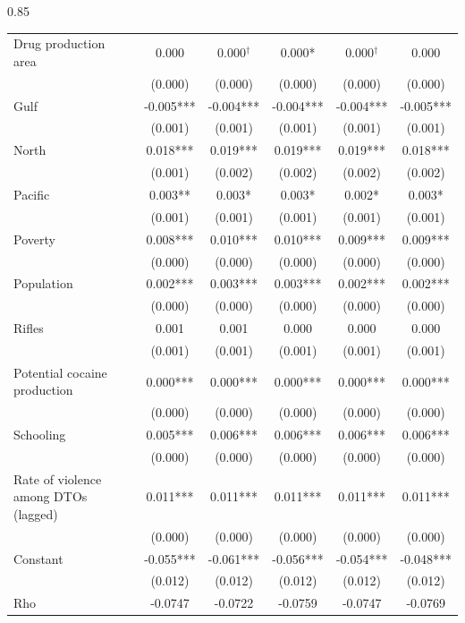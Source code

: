 \documentclass[12pt,letterpaper]{article}
\begin{document}
\begin{landscape}
\begin{center}
\begin{spacing}{0.85}
\begin{longtable}{lccccc}
Drug production area & 0.000 & 0.000$^{\dag}$ & 0.000* & 0.000$^{\dag}$ & 0.000 \\ 
 & (0.000) & (0.000) & (0.000) & (0.000) & (0.000) \\ 
Gulf & -0.005*** & -0.004*** & -0.004*** & -0.004*** & -0.005*** \\ 
 & (0.001) & (0.001) & (0.001) & (0.001) & (0.001) \\ 
North & 0.018*** & 0.019*** & 0.019*** & 0.019*** & 0.018*** \\ 
 & (0.001) & (0.002) & (0.002) & (0.002) & (0.002) \\ 
Pacific & 0.003** & 0.003* & 0.003* & 0.002* & 0.003* \\ 
 & (0.001) & (0.001) & (0.001) & (0.001) & (0.001) \\ 
Poverty & 0.008*** & 0.010*** & 0.010*** & 0.009*** & 0.009*** \\ 
 & (0.000) & (0.000) & (0.000) & (0.000) & (0.000) \\ 
Population & 0.002*** & 0.003*** & 0.003*** & 0.002*** & 0.002*** \\ 
 & (0.000) & (0.000) & (0.000) & (0.000) & (0.000) \\ 
Rifles & 0.001 & 0.001 & 0.000 & 0.000 & 0.000 \\ 
 & (0.001) & (0.001) & (0.001) & (0.001) & (0.001) \\ 
Potential cocaine production & 0.000*** & 0.000*** & 0.000*** & 0.000*** & 0.000*** \\ 
 & (0.000) & (0.000) & (0.000) & (0.000) & (0.000) \\ 
Schooling & 0.005*** & 0.006*** & 0.006*** & 0.006*** & 0.006*** \\ 
 & (0.000) & (0.000) & (0.000) & (0.000) & (0.000) \\ 
Rate of violence among DTOs (lagged) & 0.011*** & 0.011*** & 0.011*** & 0.011*** & 0.011*** \\ 
 & (0.000) & (0.000) & (0.000) & (0.000) & (0.000) \\ 
Constant & -0.055*** & -0.061*** & -0.056*** & -0.054*** & -0.048*** \\ 
 & (0.012) & (0.012) & (0.012) & (0.012) & (0.012) \\ \hline
 
Rho & -0.0747 & -0.0722 & -0.0759 & -0.0747 & -0.0769 \\ 
 

\end{longtable}
\end{spacing}
\end{center}
\end{landscape}
\end{document}
